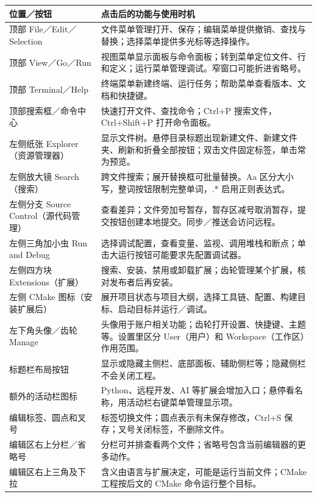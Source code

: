 \begingroup\small
\begin{longtable}{p{}p{}}
\toprule[1.5pt]
位置／按钮 & 点击后的功能与使用时机\\
\midrule[1pt]\endhead
顶部 File／Edit／Selection & 文件菜单管理打开、保存；编辑菜单提供撤销、查找与替换；选择菜单提供多光标等选择操作。\\
顶部 View／Go／Run & 视图菜单显示面板与命令面板；转到菜单定位文件、行和定义；运行菜单管理调试。窄窗口可能折进省略号。\\
顶部 Terminal／Help & 终端菜单新建终端、运行任务；帮助菜单查看版本、文档和快捷键。\\
顶部搜索框／命令中心 & 快速打开文件、查找命令；Ctrl+P 搜索文件，Ctrl+Shift+P 打开命令面板。\\
左侧纸张 Explorer（资源管理器） & 显示文件树。悬停目录标题出现新建文件、新建文件夹、刷新和折叠全部按钮；双击文件固定标签，单击常为预览。\\
左侧放大镜 Search（搜索） & 跨文件搜索；展开替换框可批量替换。Aa 区分大小写，整词按钮限制完整单词，.* 启用正则表达式。\\
左侧分支 Source Control（源代码管理） & 查看差异；文件旁加号暂存，暂存区减号取消暂存，提交按钮创建本地提交。同步／推送会访问远程。\\
左侧三角加小虫 Run and Debug & 选择调试配置，查看变量、监视、调用堆栈和断点；单击大运行按钮可能要求先配置调试器。\\
左侧四方块 Extensions（扩展） & 搜索、安装、禁用或卸载扩展；齿轮管理某个扩展，核对发布者后再安装。\\
左侧 CMake 图标（安装扩展后） & 展开项目状态与项目大纲，选择工具链、配置、构建目标、启动目标并运行／调试。\\
左下角头像／齿轮 Manage & 头像用于账户相关功能；齿轮打开设置、快捷键、主题等。设置里区分 User（用户）和 Workspace（工作区）作用范围。\\
标题栏布局按钮 & 显示或隐藏主侧栏、底部面板、辅助侧栏等；隐藏侧栏不会关闭工程。\\
额外的活动栏图标 & Python、远程开发、AI 等扩展会增加入口；悬停看名称，用活动栏右键菜单管理显示项。\\
编辑标签、圆点和叉号 & 标签切换文件；圆点表示有未保存修改，Ctrl+S 保存；叉号关闭标签，不删除文件。\\
编辑区右上分栏／省略号 & 分栏可并排查看两个文件；省略号包含当前编辑器的更多动作。\\
编辑区右上三角及下拉 & 含义由语言与扩展决定，可能是运行当前文件；CMake 工程按后文的 CMake 命令运行整个目标。\\

\end{longtable}
